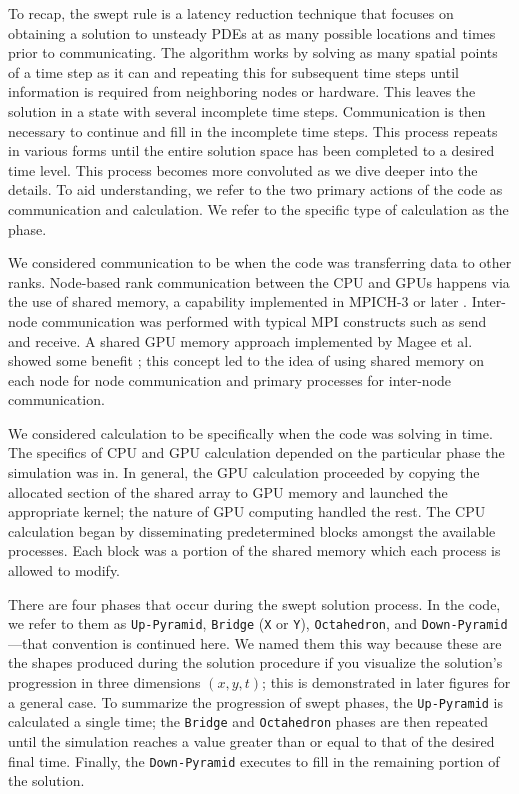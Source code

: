 \documentclass[preprints,article,accept,moreauthors,pdftex]{Definitions/mdpi}
\def\Up{\texttt{Up-Pyramid}}
\def\Down{\texttt{Down-Pyramid}}
\def\Oct{\texttt{Octahedron}}
\begin{document}
To recap, the swept rule is a latency reduction technique that focuses on obtaining a solution to unsteady PDEs at as many possible locations and times prior to communicating. The algorithm works by solving as many spatial points of a time step as it can and repeating this for subsequent time steps until information is required from neighboring nodes or hardware. This leaves the solution in a state with several incomplete time steps. Communication is then necessary to continue and fill in the incomplete time steps. This process repeats in various forms until the entire solution space has been completed to a desired time level. This process becomes more convoluted as we dive deeper into the details. To aid understanding, we refer to the two primary actions of the code as communication and calculation. We refer to the specific type of calculation as the phase. 

We considered communication to be when the code was transferring data to other ranks. Node-based rank communication between the CPU and GPUs happens via the use of shared memory, a capability implemented in MPICH-3 or later \cite{Hoefler2013MPIMemory}. Inter-node communication was performed with typical MPI constructs such as send and receive. A shared GPU memory approach implemented by Magee et al. showed some benefit \cite{Magee2018AcceleratingDecomposition}; this concept led to the idea of using shared memory on each node for node communication and primary processes for inter-node communication.
 
We considered calculation to be specifically when the code was solving in time. The specifics of CPU and GPU calculation depended on the particular phase the simulation was in. In general, the GPU calculation proceeded by copying the allocated section of the shared array to GPU memory and launched the appropriate kernel; the nature of GPU computing handled the rest. The CPU calculation began by disseminating predetermined blocks amongst the available processes. Each block was a portion of the shared memory which each process is allowed to modify.
 
There are four phases that occur during the swept solution process. In the code, we refer to them as \Up{}, \texttt{Bridge} (\texttt{X} or \texttt{Y}), \Oct{}, and \Down{}---that convention is continued here. We named them this way because these are the shapes produced during the solution procedure if you visualize the solution's progression in three dimensions $(x,y,t)$; this is demonstrated in later figures for a general case. To summarize the progression of swept phases, the \Up{} is calculated a single time; the \texttt{Bridge} and \Oct{} phases are then repeated until the simulation reaches a value greater than or equal to that of the desired final time. Finally, the \Down{} executes to fill in the remaining portion of the solution. 
\end{document}
